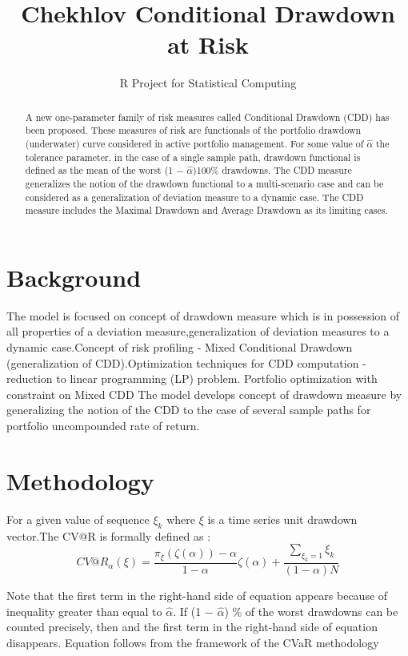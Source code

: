 \documentclass[12pt,letterpaper,english]{article}
\title{Chekhlov Conditional Drawdown at Risk}
\author{R Project for Statistical Computing}
\begin{document}


\maketitle


\begin{abstract}
A new one-parameter family of risk measures called Conditional Drawdown (CDD) has
been proposed. These measures of risk are functionals of the portfolio drawdown (underwater) curve considered in active portfolio management. For some value of $\hat{\alpha}$ the tolerance parameter, in the case of a single sample path, drawdown functional is defined as the mean of the worst (1 \(-\) $\hat{\alpha}$)100\% drawdowns. The CDD measure generalizes the notion of the drawdown functional to a multi-scenario case and can be considered as a generalization of deviation measure to a dynamic case. The CDD measure includes the Maximal Drawdown and Average Drawdown as its limiting cases.
\end{abstract}



\section{Background}

The model is focused on concept of drawdown measure which is in possession of all properties of a deviation measure,generalization of deviation measures to a dynamic case.Concept of risk profiling - Mixed Conditional Drawdown (generalization of CDD).Optimization techniques for CDD computation - reduction to linear programming (LP) problem. Portfolio optimization with constraint on Mixed CDD
The model develops concept of drawdown measure by generalizing the notion
of the CDD to the case of several sample paths for portfolio uncompounded rate
of return.


\section{Methodology}
For a given value of sequence ${\xi_k}$ where ${\xi}$ is a time series unit drawdown vector.The CV@R is formally defined as : 
\begin{equation}
CV@R_{\alpha}(\xi)=\frac{\pi_{\xi}(\zeta(\alpha))-\alpha}{1-\alpha}\zeta(\alpha) + \frac{ \sum_{\xi_k=1}^{} \xi_k}{(1-\alpha)N}
\end{equation}

Note that the first term in the right-hand side of equation appears because of inequality greater than equal to $\hat{\alpha}$. If (1 \(-\) $\hat{\alpha}$) \% of the worst drawdowns can be counted precisely, then  and the first term in the right-hand side of equation disappears. Equation follows from the framework of the CVaR methodology
\end{document}
